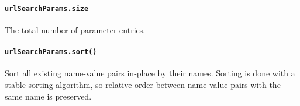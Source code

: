 \begin{Shaded}
\begin{Highlighting}[]
\OperatorTok{=}  \NormalTok{()}\OperatorTok{;}
\NormalTok{(}\OperatorTok{,} \NormalTok{)}\OperatorTok{;}
\NormalTok{(}\OperatorTok{,} \NormalTok{)}\OperatorTok{;}
\NormalTok{(}\OperatorTok{,} \NormalTok{)}\OperatorTok{;}
\NormalTok{())}\OperatorTok{;}

\NormalTok{(}\OperatorTok{,} \NormalTok{)}\OperatorTok{;}
\NormalTok{(}\OperatorTok{,} \NormalTok{)}\OperatorTok{;}
\NormalTok{())}\OperatorTok{;}
\end{Highlighting}
\end{Shaded}

\paragraph{\texorpdfstring{\texttt{urlSearchParams.size}}{urlSearchParams.size}}\label{urlsearchparams.size}

The total number of parameter entries.

\paragraph{\texorpdfstring{\texttt{urlSearchParams.sort()}}{urlSearchParams.sort()}}\label{urlsearchparams.sort}

Sort all existing name-value pairs in-place by their names. Sorting is
done with a
\href{https://en.wikipedia.org/wiki/Sorting_algorithm\#Stability}{stable
sorting algorithm}, so relative order between name-value pairs with the
same name is preserved.

